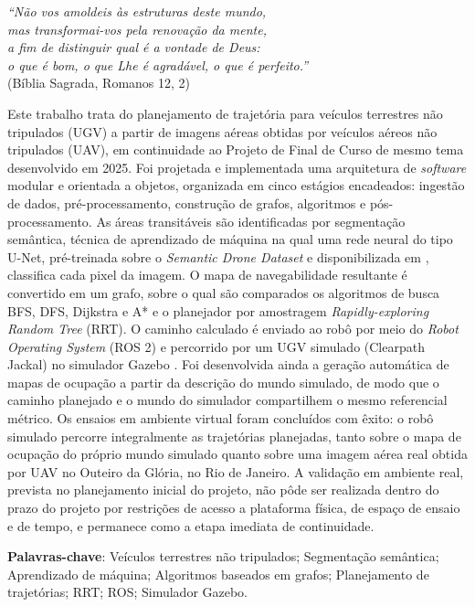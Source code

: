 \documentclass[
    12pt,
    openright,
    oneside,
    a4paper,
    english,
    brazil
]{abntex2}
\begin{document}
\begin{epigrafe}
    \vspace*{\fill}
    \begin{flushright}
        \textit{``Não vos amoldeis às estruturas deste mundo,\\
        mas transformai-vos pela renovação da mente,\\
        a fim de distinguir qual é a vontade de Deus:\\
        o que é bom, o que Lhe é agradável, o que é perfeito.''}\\
        (Bíblia Sagrada, Romanos 12, 2)
    \end{flushright}
\end{epigrafe}

\setlength{\absparsep}{18pt}
\begin{resumo}
Este trabalho trata do planejamento de trajetória para veículos terrestres não tripulados (UGV) a partir de imagens aéreas obtidas por veículos aéreos não tripulados (UAV), em continuidade ao Projeto de Final de Curso de mesmo tema desenvolvido em 2025. Foi projetada e implementada uma arquitetura de \textit{software} modular e orientada a objetos, organizada em cinco estágios encadeados: ingestão de dados, pré-processamento, construção de grafos, algoritmos e pós-processamento. As áreas transitáveis são identificadas por segmentação semântica, técnica de aprendizado de máquina na qual uma rede neural do tipo U-Net, pré-treinada sobre o \textit{Semantic Drone Dataset} \cite{drone_dataset} e disponibilizada em \cite{junior2024_models}, classifica cada pixel da imagem. O mapa de navegabilidade resultante é convertido em um grafo, sobre o qual são comparados os algoritmos de busca BFS, DFS, Dijkstra e A* e o planejador por amostragem \textit{Rapidly-exploring Random Tree} (RRT). O caminho calculado é enviado ao robô por meio do \textit{Robot Operating System} (ROS 2) \cite{quigley2009} e percorrido por um UGV simulado (Clearpath Jackal) no simulador Gazebo \cite{koenig2004}. Foi desenvolvida ainda a geração automática de mapas de ocupação a partir da descrição do mundo simulado, de modo que o caminho planejado e o mundo do simulador compartilhem o mesmo referencial métrico. Os ensaios em ambiente virtual foram concluídos com êxito: o robô simulado percorre integralmente as trajetórias planejadas, tanto sobre o mapa de ocupação do próprio mundo simulado quanto sobre uma imagem aérea real obtida por UAV no Outeiro da Glória, no Rio de Janeiro. A validação em ambiente real, prevista no planejamento inicial do projeto, não pôde ser realizada dentro do prazo do projeto por restrições de acesso a plataforma física, de espaço de ensaio e de tempo, e permanece como a etapa imediata de continuidade.

\textbf{Palavras-chave}: Veículos terrestres não tripulados; Segmentação semântica; Aprendizado de máquina; Algoritmos baseados em grafos; Planejamento de trajetórias; RRT; ROS; Simulador Gazebo.
\end{resumo}
\end{document}
